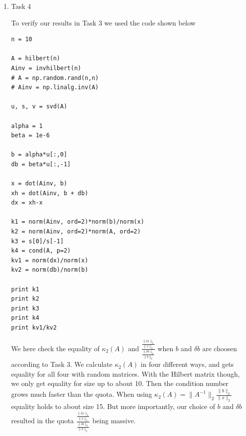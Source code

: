 \documentclass[a4paper]{article}
\begin{document}
\begin{enumerate}
\item{Task 4}

To verify our results in Task 3 we used the code shown below
\begin{lstlisting}
n = 10

A = hilbert(n)
Ainv = invhilbert(n)
# A = np.random.rand(n,n)
# Ainv = np.linalg.inv(A)

u, s, v = svd(A)

alpha = 1
beta = 1e-6

b = alpha*u[:,0]
db = beta*u[:,-1]

x = dot(Ainv, b)
xh = dot(Ainv, b + db)
dx = xh-x

k1 = norm(Ainv, ord=2)*norm(b)/norm(x)
k2 = norm(Ainv, ord=2)*norm(A, ord=2)
k3 = s[0]/s[-1]
k4 = cond(A, p=2)
kv1 = norm(dx)/norm(x)
kv2 = norm(db)/norm(b)

print k1
print k2
print k3
print k4
print kv1/kv2
\end{lstlisting}
We here check the equality of $\kappa_2(A)$ and $\frac{\frac{\|\delta x\|_2}{\|x\|_2}}{\frac{\|\delta b\|_2}{\|b\|_2}}$ when $b$ and $\delta b$ are choosen according to Task 3. We calculate $\kappa_2(A)$ in four different ways, and gets equality for all four with random matrices. With the Hilbert matrix though, we only get equality for size up to about 10. Then the condition number grows much faster than the quota. When using $\kappa_2(A) = \|A^{-1}\|_2\frac{\|b\|_2}{\|x\|_2}$ equality holds to about size 15. But more importantly, our choice of $b$ and $\delta b$ resulted in the quota $\frac{\frac{\|\delta x\|_2}{\|x\|_2}}{\frac{\|\delta b\|_2}{\|b\|_2}}$ being massive. 

\end{enumerate}
\end{document}
